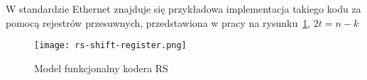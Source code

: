 W standardzie Ethernet znajduje się przykładowa implementacja takiego kodu za pomocą rejestrów przesuwnych, przedstawiona w pracy na rysunku~\ref{model-funkcjonalny}, $2t=n-k$
\begin{figure}[H]
    \texttt{[image: rs-shift-register.png]}
    \caption{Model funkcjonalny kodera RS~\cite[sekcja 91.5.2.7]{Ethernet}}\label{model-funkcjonalny}
\end{figure}
